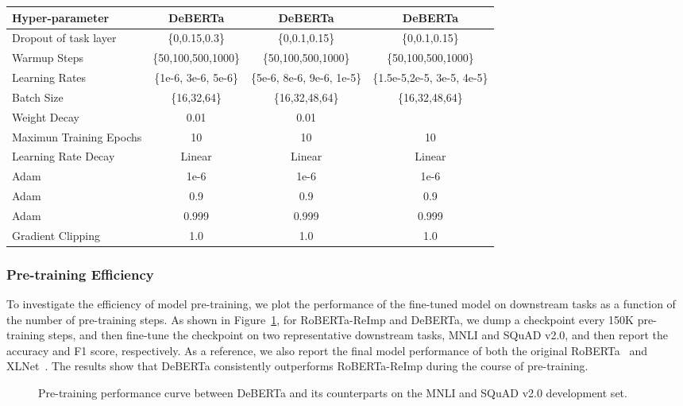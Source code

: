 \documentclass{article}
\newcommand\ModelName{DeBERTa}
\begin{document}
\begin{table*}[htb!]
   
    \centering
    \begin{tabular}{@{\hskip3pt}l@{\hskip2pt}|@{\hskip2pt} c@{\hskip2pt}|@{\hskip2pt} c@{\hskip2pt}|@{\hskip2pt} c@{\hskip2pt}}
        \toprule
          Hyper-parameter & DeBERTa& DeBERTa &  DeBERTa\\
        \midrule
        Dropout of task layer & \{0,0.15,0.3\}& \{0,0.1,0.15\} & \{0,0.1,0.15\} \\
        Warmup Steps & \{50,100,500,1000\}& \{50,100,500,1000\} & \{50,100,500,1000\} \\
        Learning Rates & \{1e-6, 3e-6, 5e-6\}& \{5e-6, 8e-6, 9e-6, 1e-5\} & \{1.5e-5,2e-5, 3e-5, 4e-5\} \\
        Batch Size & \{16,32,64\}& \{16,32,48,64\} & \{16,32,48,64\} \\
        Weight Decay & 0.01 & 0.01 \\
        Maximun Training Epochs & 10& 10 & 10 \\
        Learning Rate Decay & Linear & Linear & Linear \\
        Adam  & 1e-6 & 1e-6 & 1e-6 \\
        Adam  & 0.9 & 0.9 & 0.9 \\
        Adam  & 0.999 & 0.999 & 0.999 \\
        Gradient Clipping & 1.0 & 1.0 & 1.0 \\
        \bottomrule
        \end{tabular}
    \caption{
    Hyper-parameters for fine-tuning DeBERTa on down-streaming tasks. 
    }
     \label{tbl:hyper-ft}
\end{table*}

\subsubsection{Pre-training Efficiency}
\label{subse:eff}
To investigate the efficiency of model pre-training, we plot the performance of the fine-tuned model on downstream tasks 
as a function of the number of pre-training steps. 
As shown in Figure~\ref{fig:conv}, for RoBERTa-ReImp and {\ModelName}, we dump a checkpoint every 150K pre-training steps, and then fine-tune the checkpoint on two representative downstream tasks, MNLI and SQuAD v2.0, and then report the accuracy and F1 score, respectively.  
As a reference, we also report the final model performance of both the original RoBERTa~\citep{liu2019roberta} and XLNet~\citep{yang2019xlnet}. 
The results show that {\ModelName} consistently outperforms RoBERTa-ReImp during the course of pre-training.
\begin{figure}[htb!]
\centering  
{}
\hfill
{}
	\caption{Pre-training performance curve between {\ModelName} and its counterparts on the MNLI and SQuAD v2.0 development set.}
\label{fig:conv}
\end{figure}
\end{document}
